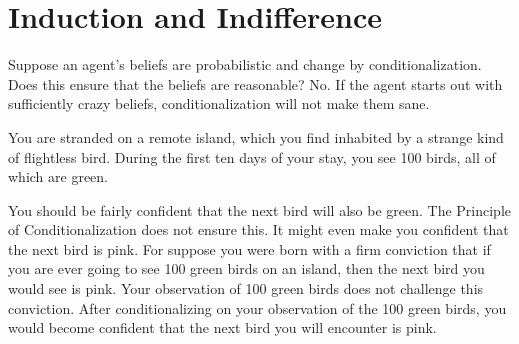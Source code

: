 
\section{Induction and Indifference}

Suppose an agent's beliefs are probabilistic and change by conditionalization.
Does this ensure that the beliefs are reasonable? No. If the agent starts out
with sufficiently crazy beliefs, conditionalization will not make them sane.

\begin{example}\label{ex:grue}
  You are stranded on a remote island, which you find inhabited by a strange
  kind of flightless bird. During the first ten days of your stay,
  you see 100 birds, all of which are green.
\end{example}
%
\noindent%
You should be fairly confident that the next bird will also be green. The
Principle of Conditionalization does not ensure this. It might even make you
confident that the next bird is pink. For suppose you were born with a firm
conviction that if you are ever going to see 100 green birds on an island, then
the next bird you would see is pink. Your observation of 100 green birds does
not challenge this conviction. After conditionalizing on your observation of the
100 green birds, you would become confident that the next bird you will
encounter is pink.

